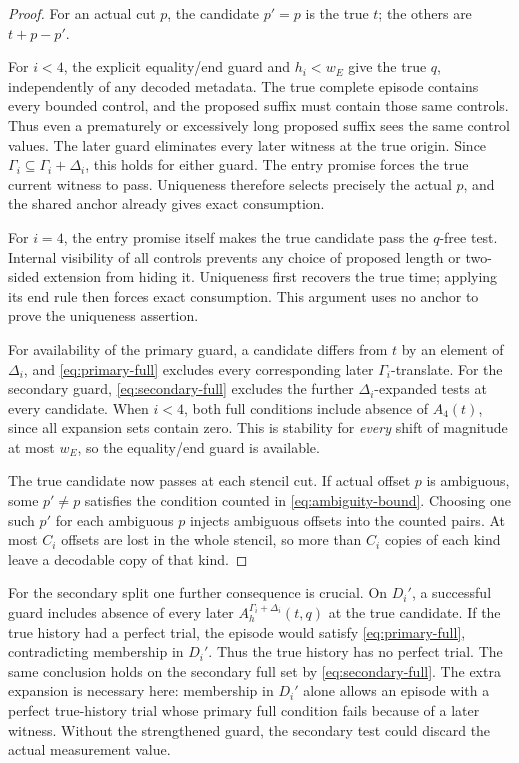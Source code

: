 \begin{proof}
For an actual cut \(p\), the candidate \(p'=p\) is the true \(t\);
the others are \(t+p-p'\).

For \(i<4\), the explicit equality/end guard and \(h_i<w_E\) give the true
\(q\), independently of any decoded metadata. The true complete episode
contains every bounded control, and the proposed suffix must contain those
same controls. Thus even a prematurely or excessively long proposed suffix
sees the same control values.
The later guard eliminates every later witness at the true origin.
Since \(\Gamma_i\subseteq\Gamma_i+\Delta_i\), this holds for either guard.
The entry promise forces the true current witness to pass. Uniqueness
therefore selects precisely the actual \(p\), and the shared anchor already
gives exact consumption.

For \(i=4\), the entry promise itself makes the true candidate pass the
\(q\)-free test. Internal visibility of all controls prevents any choice of
proposed length or two-sided extension from hiding it. Uniqueness first
recovers the true time; applying its end rule then forces exact consumption.
This argument uses no anchor to prove the uniqueness assertion.

For availability of the primary guard, a candidate differs from \(t\) by
an element of \(\Delta_i\), and \eqref{eq:primary-full} excludes every
corresponding later \(\Gamma_i\)-translate.
For the secondary guard, \eqref{eq:secondary-full} excludes the further
\(\Delta_i\)-expanded tests at every candidate.
When \(i<4\), both full conditions include absence of \(A_4(t)\), since all
expansion sets contain zero. This is stability for \emph{every} shift of
magnitude at most \(w_E\), so the equality/end guard is available.

The true candidate now passes at each stencil cut. If actual offset \(p\)
is ambiguous, some \(p'\ne p\) satisfies the condition counted in
\eqref{eq:ambiguity-bound}. Choosing one such \(p'\) for each ambiguous \(p\)
injects ambiguous offsets into the counted pairs. At most \(C_i\) offsets
are lost in the whole stencil, so more than \(C_i\) copies of each kind
leave a decodable copy of that kind.
\end{proof}

For the secondary split one further consequence is crucial. On \(D_i'\),
a successful guard includes absence of every later
\(A_h^{\Gamma_i+\Delta_i}(t,q)\) at the true candidate.
If the true history had a perfect trial, the episode would satisfy
\eqref{eq:primary-full}, contradicting membership in \(D_i'\).
Thus the true history has no perfect trial. The same conclusion holds on
the secondary full set by \eqref{eq:secondary-full}.
The extra expansion is necessary here: membership in \(D_i'\) alone
allows an episode with a perfect true-history trial whose primary full
condition fails because of a later witness. Without the strengthened
guard, the secondary test could discard the actual measurement value.

